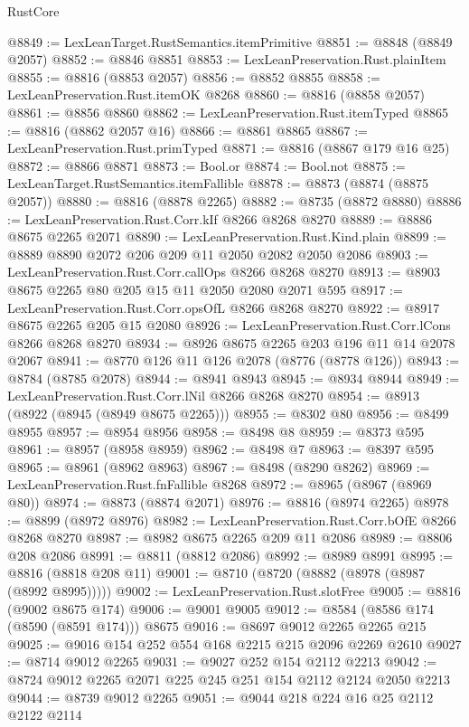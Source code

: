 \begin{lexlean}{RustCore}
\begin{coremodule}
@8849 := LexLeanTarget.RustSemantics.itemPrimitive
@8851 := @8848 (@8849 @2057)
@8852 := @8846 @8851
@8853 := LexLeanPreservation.Rust.plainItem
@8855 := @8816 (@8853 @2057)
@8856 := @8852 @8855
@8858 := LexLeanPreservation.Rust.itemOK @8268
@8860 := @8816 (@8858 @2057)
@8861 := @8856 @8860
@8862 := LexLeanPreservation.Rust.itemTyped
@8865 := @8816 (@8862 @2057 @16)
@8866 := @8861 @8865
@8867 := LexLeanPreservation.Rust.primTyped
@8871 := @8816 (@8867 @179 @16 @25)
@8872 := @8866 @8871
@8873 := Bool.or
@8874 := Bool.not
@8875 := LexLeanTarget.RustSemantics.itemFallible
@8878 := @8873 (@8874 (@8875 @2057))
@8880 := @8816 (@8878 @2265)
@8882 := @8735 (@8872 @8880)
@8886 := LexLeanPreservation.Rust.Corr.kIf @8266 @8268 @8270
@8889 := @8886 @8675 @2265 @2071
@8890 := LexLeanPreservation.Rust.Kind.plain
@8899 := @8889 @8890 @2072 @206 @209 @11 @2050 @2082 @2050 @2086
@8903 := LexLeanPreservation.Rust.Corr.callOps @8266 @8268 @8270
@8913 := @8903 @8675 @2265 @80 @205 @15 @11 @2050 @2080 @2071 @595
@8917 := LexLeanPreservation.Rust.Corr.opsOfL @8266 @8268 @8270
@8922 := @8917 @8675 @2265 @205 @15 @2080
@8926 := LexLeanPreservation.Rust.Corr.lCons @8266 @8268 @8270
@8934 := @8926 @8675 @2265 @203 @196 @11 @14 @2078 @2067
@8941 := @8770 @126 @11 @126 @2078 (@8776 (@8778 @126))
@8943 := @8784 (@8785 @2078)
@8944 := @8941 @8943
@8945 := @8934 @8944
@8949 := LexLeanPreservation.Rust.Corr.lNil @8266 @8268 @8270
@8954 := @8913 (@8922 (@8945 (@8949 @8675 @2265)))
@8955 := @8302 @80
@8956 := @8499 @8955
@8957 := @8954 @8956
@8958 := @8498 @8
@8959 := @8373 @595
@8961 := @8957 (@8958 @8959)
@8962 := @8498 @7
@8963 := @8397 @595
@8965 := @8961 (@8962 @8963)
@8967 := @8498 (@8290 @8262)
@8969 := LexLeanPreservation.Rust.fnFallible @8268
@8972 := @8965 (@8967 (@8969 @80))
@8974 := @8873 (@8874 @2071)
@8976 := @8816 (@8974 @2265)
@8978 := @8899 (@8972 @8976)
@8982 := LexLeanPreservation.Rust.Corr.bOfE @8266 @8268 @8270
@8987 := @8982 @8675 @2265 @209 @11 @2086
@8989 := @8806 @208 @2086
@8991 := @8811 (@8812 @2086)
@8992 := @8989 @8991
@8995 := @8816 (@8818 @208 @11)
@9001 := @8710 (@8720 (@8882 (@8978 (@8987 (@8992 @8995)))))
@9002 := LexLeanPreservation.Rust.slotFree
@9005 := @8816 (@9002 @8675 @174)
@9006 := @9001 @9005
@9012 := @8584 (@8586 @174 (@8590 (@8591 @174))) @8675
@9016 := @8697 @9012 @2265 @2265 @215
@9025 := @9016 @154 @252 @554 @168 @2215 @215 @2096 @2269 @2610
@9027 := @8714 @9012 @2265
@9031 := @9027 @252 @154 @2112 @2213
@9042 := @8724 @9012 @2265 @2071 @225 @245 @251 @154 @2112 @2124 @2050 @2213
@9044 := @8739 @9012 @2265
@9051 := @9044 @218 @224 @16 @25 @2112 @2122 @2114

\end{coremodule}
\end{lexlean}
